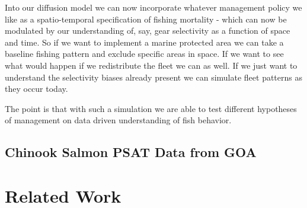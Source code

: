 \documentclass[11pt]{article}
\begin{document}
Into our diffusion model we can now incorporate whatever management policy we like as a spatio-temporal specification of fishing mortality - which can now be modulated by our understanding of, say, gear selectivity as a function of space and time. So if we want to implement a marine protected area we can take a baseline fishing pattern and exclude specific areas in space. If we want to see what would happen if we redistribute the fleet we can as well. If we just want to understand the selectivity biases already present we can simulate fleet patterns as they occur today. 

The point is that with such a simulation we are able to test different hypotheses of management on data driven understanding of fish behavior. 


\subsection{Chinook Salmon PSAT Data from GOA}



























\newpage















\section{Related Work}
\end{document}
